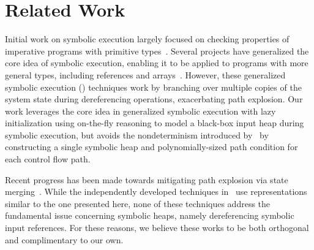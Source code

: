 \section{Related Work}


Initial work on symbolic execution largely focused on checking
properties of imperative programs with primitive
types~\cite{Clarke:76,King:76}.
Several projects have generalized the core idea of symbolic execution,
enabling it to be applied to programs with more general types,
including references and
arrays~\cite{GSE03,KiasanKunit,Cadar:2008,Rosner:2015}. However, these
generalized symbolic execution (\gsetxt{}) techniques work by branching over
multiple copies of the system state during dereferencing operations,
exacerbating path explosion.
Our work leverages the core idea in generalized symbolic execution
with lazy initialization using on-the-fly reasoning to model a
black-box input heap during symbolic execution, but avoids the
nondeterminism introduced by~\gsetxt{} by constructing a single
symbolic heap and polynomially-sized path condition for each control
flow path.

Recent progress has been made towards mitigating path explosion via state merging~\cite{Kuznetsov:2012,Sen:2014,Torlak:2014}. While the independently developed techniques in~\cite{Sen:2014,Torlak:2014} use representations similar to the one presented here, none of these techniques address the fundamental issue concerning symbolic heaps, namely dereferencing symbolic input references. For these reasons, we believe these works to be both orthogonal and complimentary to our own.


